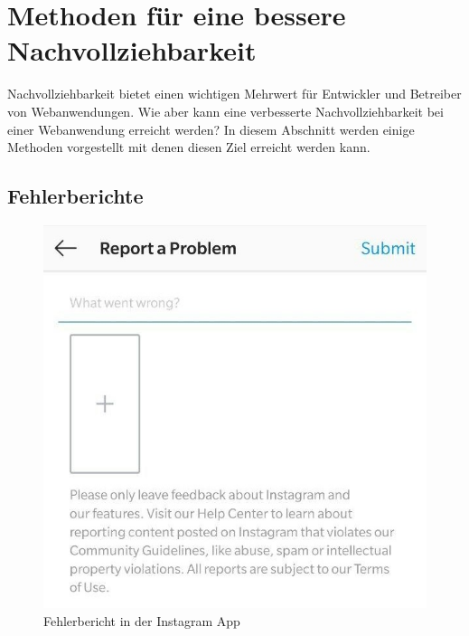 

\section{Methoden für eine bessere Nachvollziehbarkeit}
\label{sec:methoden}

Nachvollziehbarkeit bietet einen wichtigen Mehrwert für Entwickler und Betreiber von Webanwendungen. Wie aber kann eine verbesserte Nachvollziehbarkeit bei einer Webanwendung erreicht werden? In diesem Abschnitt werden einige Methoden vorgestellt mit denen diesen Ziel erreicht werden kann.

\subsection{Fehlerberichte}

\begin{figure}
\centering
\includegraphics[width=\linewidth]{img/instagram-feedback/instagram-feedback.jpg}
\caption{Fehlerbericht in der Instagram App \cite{Instagram}}
\label{fig:instagram-bug-report}
\end{figure}

